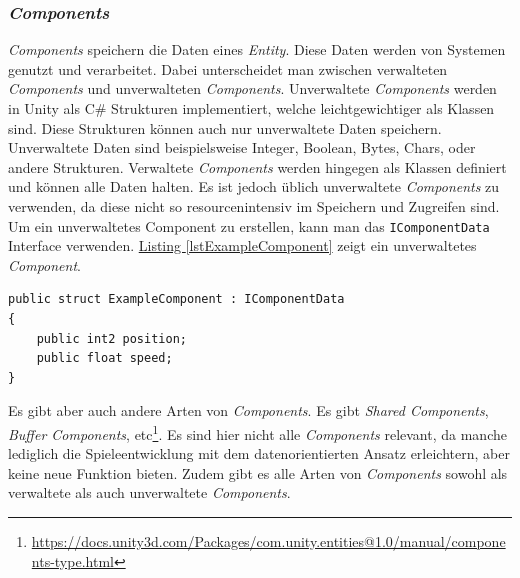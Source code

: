 \subsubsection[\textit{Components}]{\textit{Components}} \label{components}
\textit{Components} speichern die Daten eines \textit{Entity}. Diese Daten werden von Systemen genutzt und verarbeitet. Dabei unterscheidet man zwischen verwalteten \textit{Components} und unverwalteten \textit{Components}. Unverwaltete \textit{Components} werden in Unity als C\# Strukturen implementiert, welche leichtgewichtiger als Klassen sind. Diese Strukturen können auch nur unverwaltete Daten speichern. Unverwaltete Daten sind beispielsweise Integer, Boolean, Bytes, Chars, oder andere Strukturen. Verwaltete \textit{Components} werden hingegen als Klassen definiert und können alle Daten halten. Es ist jedoch üblich unverwaltete \textit{Components} zu verwenden, da diese nicht so resourcenintensiv im Speichern und Zugreifen sind. Um ein unverwaltetes Component zu erstellen, kann man das \texttt{IComponentData} Interface verwenden. \hyperref[lstExampleComponent]{Listing \ref*{lstExampleComponent}} zeigt ein unverwaltetes \textit{Component}.
\begin{lstlisting}[style=code, caption={[Beispiel eines unverwalteten \textit{Components}]Beispiel eines unverwalteten \textit{Components}. Das \textit{Component} speichert die Position und die Geschwindigkeit eines \textit{Entity}.}, label=lstExampleComponent]
public struct ExampleComponent : IComponentData
{
    public int2 position;
    public float speed;
}
\end{lstlisting}
Es gibt aber auch andere Arten von \textit{Components}. Es gibt \textit{Shared Components}, \textit{Buffer Components}, etc\footnote{\url{https://docs.unity3d.com/Packages/com.unity.entities@1.0/manual/components-type.html}}. Es sind hier nicht alle \textit{Components} relevant, da manche lediglich die Spieleentwicklung mit dem datenorientierten Ansatz erleichtern, aber keine neue Funktion bieten. Zudem gibt es alle Arten von \textit{Components} sowohl als verwaltete als auch unverwaltete \textit{Components}.\\
